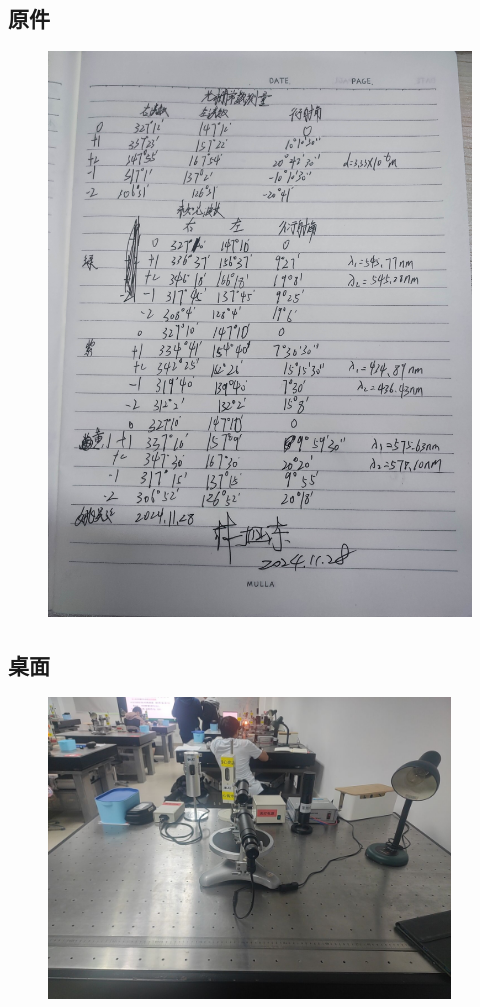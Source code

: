\documentclass[dvipsnames, svgnames,a4paper,11pt]{article}
\begin{document}
\appendix
\appendixpage
\addappheadtotoc
%
\subsection*{原件}
%
\begin{figure}[H]
	\centering
	\includegraphics[width=\textwidth]{光栅数据.jpg}
\end{figure}

\subsection*{桌面}
\begin{figure}[H]
	\includegraphics[width=0.95\textwidth]{光栅桌面.jpg}
\end{figure}
\end{document}
